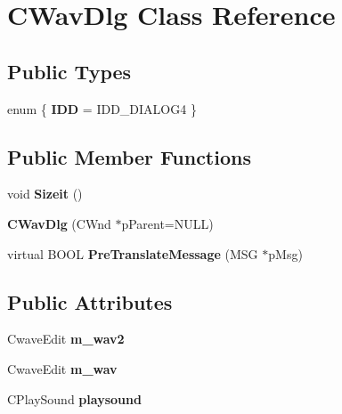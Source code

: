 \hypertarget{class_c_wav_dlg}{\section{C\-Wav\-Dlg Class Reference}
\label{class_c_wav_dlg}
}
\subsection*{Public Types}
\begin{DoxyCompactItemize}
\item 
enum \{ {\bfseries I\-D\-D} =  I\-D\-D\-\_\-\-D\-I\-A\-L\-O\-G4
 \}
\end{DoxyCompactItemize}
\subsection*{Public Member Functions}
\begin{DoxyCompactItemize}
\item 
\hypertarget{class_c_wav_dlg_a3d6d10edb28c4a3ad9a1e940f35c7b23}{void {\bfseries Sizeit} ()}\label{class_c_wav_dlg_a3d6d10edb28c4a3ad9a1e940f35c7b23}

\item 
\hypertarget{class_c_wav_dlg_aa788eb2f75f9cfad1e05a54b7f3a8780}{{\bfseries C\-Wav\-Dlg} (C\-Wnd $\ast$p\-Parent=N\-U\-L\-L)}\label{class_c_wav_dlg_aa788eb2f75f9cfad1e05a54b7f3a8780}

\item 
\hypertarget{class_c_wav_dlg_ae94a9f203f08efc3f8c985f0e88e7d6a}{virtual B\-O\-O\-L {\bfseries Pre\-Translate\-Message} (M\-S\-G $\ast$p\-Msg)}\label{class_c_wav_dlg_ae94a9f203f08efc3f8c985f0e88e7d6a}

\end{DoxyCompactItemize}
\subsection*{Public Attributes}
\begin{DoxyCompactItemize}
\item 
\hypertarget{class_c_wav_dlg_a8094830702ea98a969e9c9ed4be4fa29}{Cwave\-Edit {\bfseries m\-\_\-wav2}}\label{class_c_wav_dlg_a8094830702ea98a969e9c9ed4be4fa29}

\item 
\hypertarget{class_c_wav_dlg_a6cbf1807c59427500cd7dcffbb2ae69c}{Cwave\-Edit {\bfseries m\-\_\-wav}}\label{class_c_wav_dlg_a6cbf1807c59427500cd7dcffbb2ae69c}

\item 
\hypertarget{class_c_wav_dlg_a5fdad820e405c213c12bc02eafaacdcf}{C\-Play\-Sound {\bfseries playsound}}\label{class_c_wav_dlg_a5fdad820e405c213c12bc02eafaacdcf}

\end{DoxyCompactItemize}
